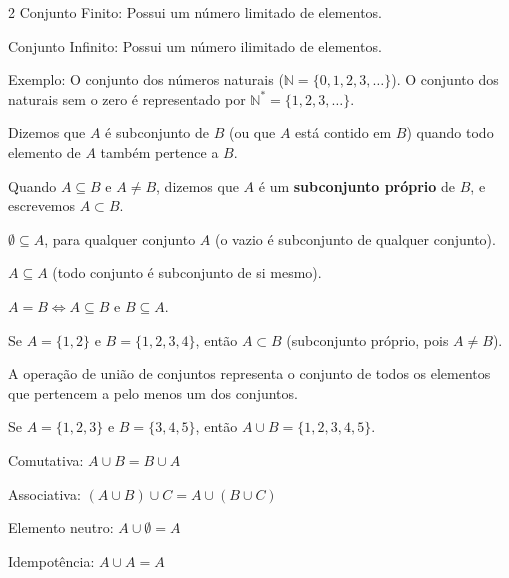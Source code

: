\documentclass[12pt]{article}
\begin{document}
\begin{multicols}{2}
Conjunto Finito: Possui um número limitado de elementos.
 
Conjunto Infinito: Possui um número ilimitado de elementos.

\hspace{1cm}Exemplo: O conjunto dos números naturais ($\mathbb{N} = \{0, 1, 2, 3, \ldots\}$). O conjunto dos naturais sem o zero é representado por $\mathbb{N}^* = \{1, 2, 3, \ldots\}$.


Dizemos que $A$ é subconjunto de $B$ (ou que $A$ está contido em $B$) quando todo elemento de $A$ também pertence a $B$.


Quando $A \subseteq B$ e $A \neq B$, dizemos que $A$ é um \textbf{subconjunto próprio} de $B$, e escrevemos $A \subset B$.


\hspace{1cm}$\emptyset \subseteq A$, para qualquer conjunto $A$ (o vazio é subconjunto de qualquer conjunto).

\hspace{1cm}$A \subseteq A$ (todo conjunto é subconjunto de si mesmo).

\hspace{1cm}$A = B \iff A \subseteq B$ e $B \subseteq A$.


Se $A = \{1, 2\}$ e $B = \{1, 2, 3, 4\}$, então $A \subset B$ (subconjunto próprio, pois $A \neq B$).


A operação de união de conjuntos representa o conjunto de todos os elementos que pertencem a pelo menos um dos conjuntos.


Se $A = \{1, 2, 3\}$ e $B = \{3, 4, 5\}$, então $A \cup B = \{1, 2, 3, 4, 5\}$.


\hspace{1cm}Comutativa: $A \cup B = B \cup A$

\hspace{1cm}Associativa: $(A \cup B) \cup C = A \cup (B \cup C)$

\hspace{1cm}Elemento neutro: $A \cup \emptyset = A$

\hspace{1cm}Idempotência: $A \cup A = A$


\end{multicols}
\end{document}
